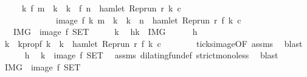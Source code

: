 \begin{isabellebody}
\ \ \ \ \ {\isacartoucheopen}{\isacharbraceleft}k{\isachardot}\ f\ m\ {\isacharless}\ k\ {\isasymand}\ k\ {\isacharless}\ f\ n\ {\isasymand}\ hamlet\ {\isacharparenleft}{\isacharparenleft}Rep{\isacharunderscore}run\ r{\isacharparenright}\ k\ c{\isacharparenright}{\isacharbraceright}\isanewline
\ \ \ \ \ \ \ \ \ \ \ \ {\isacharequal}\ image\ f\ {\isacharbraceleft}k{\isachardot}\ m\ {\isacharless}\ k\ {\isasymand}\ k\ {\isacharless}\ n\ {\isasymand}\ hamlet\ {\isacharparenleft}{\isacharparenleft}Rep{\isacharunderscore}run\ r{\isacharparenright}\ {\isacharparenleft}f\ k{\isacharparenright}\ c{\isacharparenright}{\isacharbraceright}{\isacartoucheclose}\isanewline
\ \ {\isacharparenleft}\ {\isacartoucheopen}{\isacharquery}IMG\ {\isacharequal}\ image\ f\ {\isacharquery}SET{\isacartoucheclose}{\isacharparenright}\isanewline
%
\isadelimproof
%
\endisadelimproof
%
\isatagproof
{}\isamarkupfalse%
\isanewline
\ \ \isacommand{{\isacharbraceleft}}\isamarkupfalse%
\ \isamarkupfalse%
\ k\ \isamarkupfalse%
\ h{\isacharcolon}{\isacartoucheopen}k\ {\isasymin}\ {\isacharquery}IMG{\isacartoucheclose}\isanewline
\ \ \ \ \isamarkupfalse%
\ h\ \isamarkupfalse%
\ k\ \ k{}prop{\isacharcolon}{\isacartoucheopen}f\ k\ {\isacharequal}\ k\ {\isasymand}\ hamlet\ {\isacharparenleft}{\isacharparenleft}Rep{\isacharunderscore}run\ r{\isacharparenright}\ {\isacharparenleft}f\ k\ c{\isacharparenright}{\isacartoucheclose}\isanewline
\ \ \ \ \ \ \isamarkupfalse%
\ ticks{\isacharunderscore}image{\isacharbrackleft}OF\ assms{\isacharbrackright}\ \isamarkupfalse%
\ blast\isanewline
\ \ \ \ \isamarkupfalse%
\ h\ \isamarkupfalse%
\ {\isacartoucheopen}k\ {\isasymin}\ image\ f\ {\isacharquery}SET{\isacartoucheclose}\ \isamarkupfalse%
\ assms\ dilating{\isacharunderscore}fun{\isacharunderscore}def\ strict{\isacharunderscore}mono{\isacharunderscore}less\ \isamarkupfalse%
\ blast\isanewline
\ \ \isacommand{{\isacharbraceright}}\isamarkupfalse%
\ \isamarkupfalse%
\ {\isacartoucheopen}{\isacharquery}IMG\ {\isasymsubseteq}\ image\ f\ {\isacharquery}SET{\isacartoucheclose}\ \isacommand{{\isachardot}{\isachardot}}\isamarkupfalse%
\isanewline
{}\isamarkupfalse%
\isanewline
\ \ \isacommand{{\isacharbraceleft}}\isamarkupfalse%
\ \isamarkupfalse%

\end{isabellebody}

